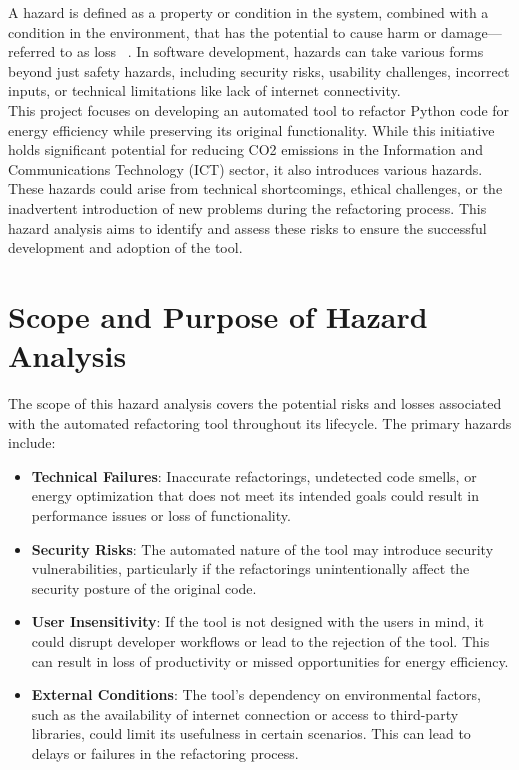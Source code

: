 \documentclass{article}
\begin{document}
A hazard is defined as a property or condition in the system, 
combined with a condition in the environment, that has the potential to cause harm 
or damage—referred to as loss ~\citep{Leveson2021}. In software development, hazards can take various 
forms beyond just safety hazards, including security risks, usability challenges, 
incorrect inputs, or technical limitations like lack of internet connectivity.
\\

This project focuses on developing an automated tool to refactor Python code 
for energy efficiency while preserving its original functionality. While this 
initiative holds significant potential for reducing CO2 emissions in the 
Information and Communications Technology (ICT) sector, it also introduces 
various hazards. These hazards could arise from technical shortcomings, ethical 
challenges, or the inadvertent introduction of new problems during the refactoring 
process. This hazard analysis aims to identify and assess these risks to ensure 
the successful development and adoption of the tool.

\section{Scope and Purpose of Hazard Analysis}

The scope of this hazard analysis covers the potential risks and losses associated 
with the automated refactoring tool throughout its lifecycle. The primary hazards include:

\begin{itemize}

    \item \textbf{Technical Failures}: Inaccurate refactorings, undetected code 
    smells, or energy optimization that does not meet its intended goals could 
    result in performance issues or loss of functionality. 

    \item \textbf{Security Risks}: The automated nature of the tool may introduce 
    security vulnerabilities, particularly if the refactorings unintentionally 
    affect the security posture of the original code.

    \item \textbf{User Insensitivity}: If the tool is not designed with the users 
    in mind, it could disrupt developer workflows or lead to the rejection of the 
    tool. This can result in loss of productivity or missed opportunities for 
    energy efficiency.

    \item \textbf{External Conditions}: The tool’s dependency on environmental 
    factors, such as the availability of internet connection or access to 
    third-party libraries, could limit its usefulness in certain scenarios. 
    This can lead to delays or failures in the refactoring process.

\end{itemize}
\end{document}
